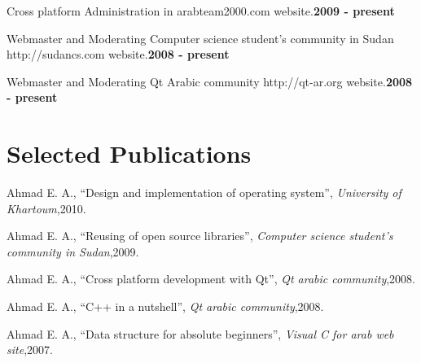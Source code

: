 \documentclass[margin,line]{resume}
\begin{document}
\begin{resume}
Cross platform Administration in arabteam2000.com website.\hfill \textbf{2009 - present}\vspace{-3mm}\\\vspace{-1mm}

Webmaster and Moderating Computer science student's community in Sudan http://sudancs.com website.\hfill \textbf{2008 - present}\vspace{-3mm}\\\vspace{-1mm}

Webmaster and Moderating Qt Arabic community http://qt-ar.org website.\hfill \textbf{2008 - present}\vspace{-3mm}\\\vspace{-1mm}

    \section{\mysidestyle Selected Publications}

   Ahmad E. A.,
   ``Design and implementation of operating system'',
    \textsl{University of Khartoum},2010.

\vspace{-2mm}

   Ahmad E. A.,
   ``Reusing of open source libraries'',
    \textsl{Computer science student's community in Sudan},2009.

\vspace{-2mm}

   Ahmad E. A.,
   ``Cross platform development with Qt'',
    \textsl{Qt arabic community},2008.

\vspace{-2mm}

 Ahmad E. A.,
   ``C++ in a nutshell'',
    \textsl{Qt arabic community},2008.

\vspace{-2mm}

 Ahmad E. A.,
   ``Data structure for absolute beginners'',
    \textsl{Visual C for arab web site},2007.

\vspace{-2mm}



\end{resume}
\end{document}
